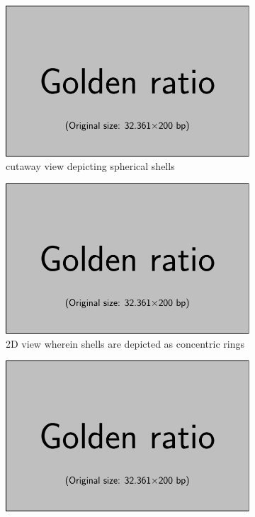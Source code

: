 \begin{figure}[h]
    \centering
    \begin{subfigure}[b]{0.3\textwidth}
        \centering
        \includegraphics[width=\textwidth]{placeholder_images/example-image-golden.pdf}
        \caption{cutaway view depicting spherical shells}
        \label{subfig:radialdisc3d}
    \end{subfigure}
    \hfill
    \begin{subfigure}[b]{0.3\textwidth}
        \centering
        \includegraphics[width=\textwidth]{placeholder_images/example-image-golden.pdf}
        \caption{2D view wherein shells are depicted as concentric rings}
        \label{subfig:radialdisc2d}
    \end{subfigure}
    \hfill
    \begin{subfigure}[b]{0.3\textwidth}
        \centering
        \includegraphics[width=\textwidth]{placeholder_images/example-image-golden.pdf}

\end{subfigure}
\end{figure}
